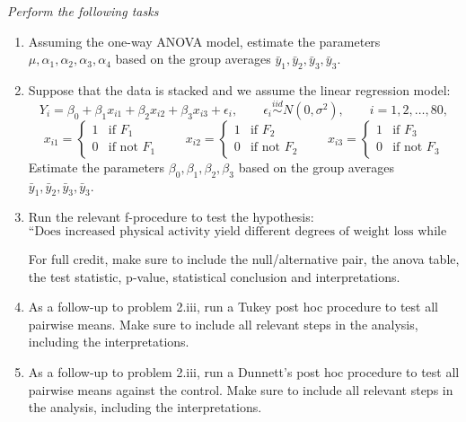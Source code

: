\documentclass[letterpaper]{article}
\begin{document}
		\emph{Perform the following tasks}
		\begin{enumerate}
			\item[(i)] Assuming the one-way ANOVA model, estimate the parameters $\mu,\alpha_1,\alpha_2,\alpha_3,\alpha_4$ based on the group averages $\bar{y}_1,\bar{y}_2,\bar{y}_3,\bar{y}_3$.
			
			\item[(ii)] Suppose that the data is stacked and we assume the linear regression model:
			\[
			Y_i=\beta_0+\beta_1 x_{i1}+\beta_2 x_{i2}+\beta_3 x_{i3}+\epsilon_i,
			\qquad
			\epsilon_i\overset{iid}{\sim}N(0,\sigma^2),
			\qquad
			i=1,2,\ldots,80,
			\]
			\[
			x_{i1}=
			\begin{cases}
				1 & \text{if } F_1 \\
				0 & \text{if not } F_1
			\end{cases}
			\qquad
			x_{i2}=
			\begin{cases}
				1 & \text{if } F_2 \\
				0 & \text{if not } F_2
			\end{cases}
			\qquad
			x_{i3}=
			\begin{cases}
				1 & \text{if } F_3 \\
				0 & \text{if not } F_3
			\end{cases}
			\]
			Estimate the parameters $\beta_0,\beta_1,\beta_2,\beta_3$ based on the group averages $\bar{y}_1,\bar{y}_2,\bar{y}_3,\bar{y}_3$.
			
			\item[(iii)] Run the relevant f-procedure to test the hypothesis:
			\[
			\text{``Does increased physical activity yield different degrees of weight loss while dieting?''}
			\]
			
			For full credit, make sure to include the null/alternative pair, the anova table, the test statistic, p-value, statistical conclusion and interpretations.
			
			\item[(iv)] As a follow-up to problem 2.iii, run a Tukey post hoc procedure to test all pairwise means. Make sure to include all relevant steps in the analysis, including the interpretations.
			
			\item[(v)] As a follow-up to problem 2.iii, run a Dunnett's post hoc procedure to test all pairwise means against the control. Make sure to include all relevant steps in the analysis, including the interpretations.
			

\end{enumerate}
\end{document}
